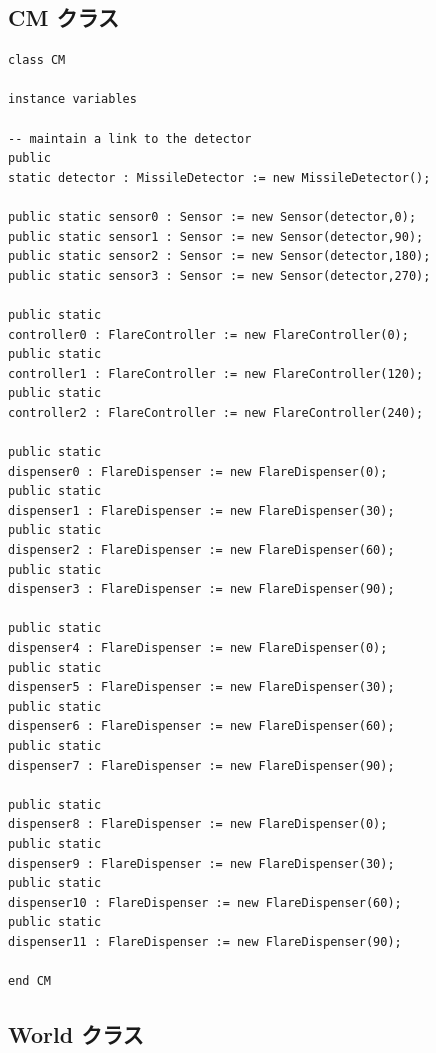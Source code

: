 \documentclass[\pformat,12pt]{jreport}
\begin{document}
\subsection{CM クラス}

\begin{lstlisting}
class CM

instance variables

-- maintain a link to the detector
public 
static detector : MissileDetector := new MissileDetector();

public static sensor0 : Sensor := new Sensor(detector,0);
public static sensor1 : Sensor := new Sensor(detector,90);
public static sensor2 : Sensor := new Sensor(detector,180);
public static sensor3 : Sensor := new Sensor(detector,270);

public static 
controller0 : FlareController := new FlareController(0);
public static 
controller1 : FlareController := new FlareController(120);
public static 
controller2 : FlareController := new FlareController(240);

public static 
dispenser0 : FlareDispenser := new FlareDispenser(0);
public static 
dispenser1 : FlareDispenser := new FlareDispenser(30);
public static 
dispenser2 : FlareDispenser := new FlareDispenser(60);
public static 
dispenser3 : FlareDispenser := new FlareDispenser(90);

public static 
dispenser4 : FlareDispenser := new FlareDispenser(0);
public static 
dispenser5 : FlareDispenser := new FlareDispenser(30);
public static 
dispenser6 : FlareDispenser := new FlareDispenser(60);
public static 
dispenser7 : FlareDispenser := new FlareDispenser(90);

public static 
dispenser8 : FlareDispenser := new FlareDispenser(0);
public static 
dispenser9 : FlareDispenser := new FlareDispenser(30);
public static 
dispenser10 : FlareDispenser := new FlareDispenser(60);
public static 
dispenser11 : FlareDispenser := new FlareDispenser(90);

end CM
\end{lstlisting}

\subsection{World クラス}
\end{document}
